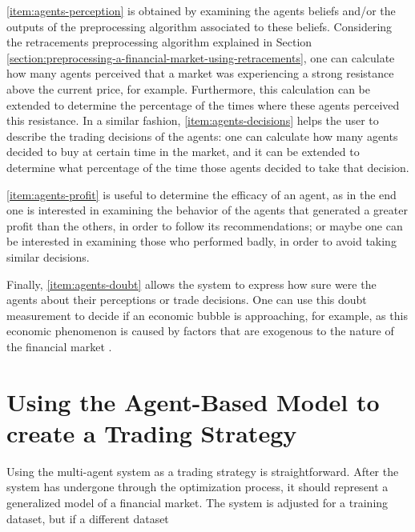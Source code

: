 \ref{item:agents-perception} is obtained by examining the agents beliefs and/or
the outputs of the preprocessing algorithm associated to these
beliefs. Considering the retracements preprocessing algorithm explained in
Section \ref{section:preprocessing-a-financial-market-using-retracements}, one
can calculate how many agents perceived that a market was experiencing a strong
resistance above the current price, for example. Furthermore, this calculation
can be extended to determine the percentage of the times where these agents
perceived this resistance. In a similar fashion, \ref{item:agents-decisions}
helps the user to describe the trading decisions of the agents: one can
calculate how many agents decided to buy at certain time in the market, and it
can be extended to determine what percentage of the time those agents decided to
take that decision.

\ref{item:agents-profit} is useful to determine the efficacy of an agent, as in
the end one is interested in examining the behavior of the agents that generated
a greater profit than the others, in order to follow its recommendations; or
maybe one can be interested in examining those who performed badly, in order to
avoid taking similar decisions.

Finally, \ref{item:agents-doubt} allows the system to express how sure were the
agents about their perceptions or trade decisions. One can use this doubt
measurement to decide if an economic bubble is approaching, for example, as this
economic phenomenon is caused by factors that are exogenous to the nature of the
financial market \cite{Martin2011}.

\section{Using the Agent-Based Model to create a Trading Strategy}
\label{section:using-the-agent-based-model-to-create-a-trading-strategy}

Using the multi-agent system as a trading strategy is straightforward. After
the system has undergone through the optimization process, it should represent a
generalized model of a financial market. The system is adjusted for a training
dataset, but if a different dataset
